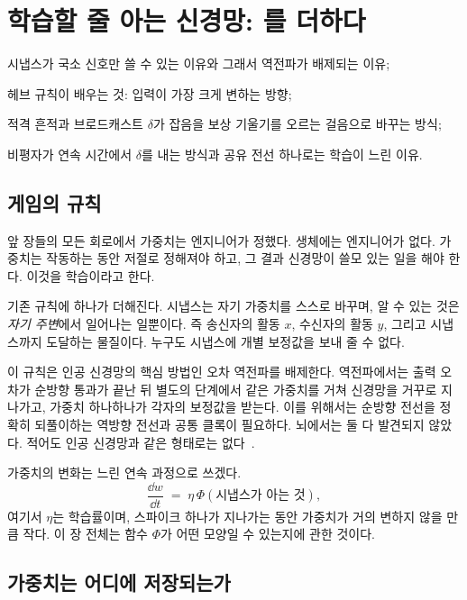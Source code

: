 \chapter{학습할 줄 아는 신경망: 를 더하다}
\label{sec:dofa}
\begin{chaptergoals}
\item 시냅스가 국소 신호만 쓸 수 있는 이유와 그래서 역전파가 배제되는 이유;
\item 헤브 규칙이 배우는 것: 입력이 가장 크게 변하는 방향;
\item 적격 흔적과 브로드캐스트 $\delta$가 잡음을 보상 기울기를 오르는 걸음으로 바꾸는 방식;
\item 비평자가 연속 시간에서 $\delta$를 내는 방식과 공유 전선 하나로는 학습이 느린 이유.
\end{chaptergoals}

\section{게임의 규칙}

앞 장들의 모든 회로에서 가중치는 엔지니어가 정했다. 생체에는 엔지니어가 없다. 가중치는 작동하는 동안 저절로 정해져야 하고, 그 결과 신경망이 쓸모 있는 일을 해야 한다. 이것을 학습이라고 한다.

기존 규칙에 하나가 더해진다. 시냅스는 자기 가중치를 스스로 바꾸며, 알 수 있는 것은 \emph{자기 주변}에서 일어나는 일뿐이다. 즉 송신자의 활동 $x$, 수신자의 활동 $y$, 그리고 시냅스까지 도달하는 물질이다. 누구도 시냅스에 개별 보정값을 보내 줄 수 없다.

이 규칙은 인공 신경망의 핵심 방법인 오차 역전파를 배제한다. 역전파에서는 출력 오차가 순방향 통과가 끝난 뒤 별도의 단계에서 같은 가중치를 거쳐 신경망을 거꾸로 지나가고, 가중치 하나하나가 각자의 보정값을 받는다. 이를 위해서는 순방향 전선을 정확히 되풀이하는 역방향 전선과 공통 클록이 필요하다. 뇌에서는 둘 다 발견되지 않았다. 적어도 인공 신경망과 같은 형태로는 없다~\cite{Lillicrap2020,WhittingtonBogacz2019}.

가중치의 변화는 느린 연속 과정으로 쓰겠다.
\begin{equation}
\frac{\dd w}{\dd t} \;=\; \eta\,\Phi(\text{시냅스가 아는 것}),
\label{eq:plasticity}
\end{equation}
여기서 $\eta$는 학습률이며, 스파이크 하나가 지나가는 동안 가중치가 거의 변하지 않을 만큼 작다. 이 장 전체는 함수 $\Phi$가 어떤 모양일 수 있는지에 관한 것이다.

\section{가중치는 어디에 저장되는가}
\label{sec:weightstore}

